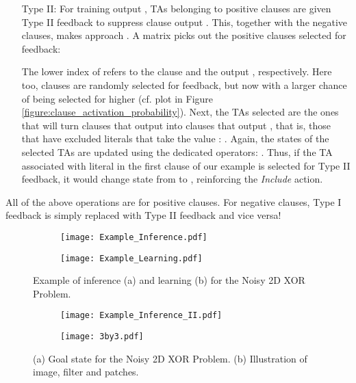 \documentclass{article}
\begin{document}
\begin{itemize}
\item[Type II:] For training output , TAs belonging to positive clauses are given Type II feedback to suppress clause output . This, together with the negative clauses, makes  approach . A matrix  picks out the positive clauses selected for feedback:

The lower index of  refers to the clause  and the output , respectively. Here too, clauses are randomly selected for feedback, but now with a larger chance of being selected for higher  (cf. plot  in Figure \ref{figure:clause_activation_probability}). Next, the TAs selected are the ones that will turn clauses that output  into clauses that output , that is, those that have excluded literals that take the value :
.
Again, the states of the selected TAs are updated using the dedicated operators:
. Thus, if the TA associated with literal  in the first clause of our example is selected for Type II feedback, it would change state from  to , reinforcing the \emph{Include} action.
\end{itemize}

All of the above operations are for positive clauses. For negative clauses, Type I feedback is simply replaced with Type II feedback and vice versa!

\begin{figure}[!h]
\centering
\begin{subfigure}[t]{.49\textwidth}
\texttt{[image: Example\_Inference.pdf]}
\caption{}
\label{figure:inference_example}
\end{subfigure}
\hspace{0mm}
\begin{subfigure}[t]{.49\textwidth}
\texttt{[image: Example\_Learning.pdf]}
\caption{}
\label{figure:learning_example}
\end{subfigure}
\caption{Example of inference (a) and learning (b) for the Noisy 2D XOR Problem.}
\end{figure}

\begin{figure}[!h]
\centering
\begin{subfigure}[t]{.49\textwidth}
\texttt{[image: Example\_Inference\_II.pdf]}
\caption{}
\label{figure:goal_state}
\end{subfigure}
\hspace{0mm}
\begin{subfigure}[t]{.4\textwidth}
\texttt{[image: 3by3.pdf]}
\caption{}
\label{figure:convolution}
\end{subfigure}
\caption{(a) Goal state for the Noisy 2D XOR Problem. (b) Illustration of image, filter and patches.}\label{figure:example}
\end{figure}
\end{document}
